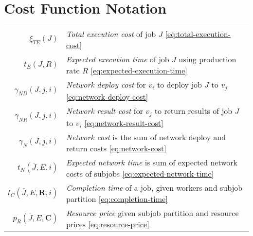 \documentclass[../mthe-493-project-proposal.tex]{subfiles}
\begin{document}
    \section*{Cost Function Notation}
    \begin{tabular}{rl}
    \(\xi_{TE}(J)\) & \textit{Total execution cost} of job \(J\) \eqref{eq:total-execution-cost} \\
    \(t_E(J, R)\) & \textit{Expected execution time} of job \(J\) using production rate \(R\) \eqref{eq:expected-execution-time} \\
    \(\gamma_{ND}(J, j, i)\) & \textit{Network deploy cost} for \(v_i\) to deploy job \(J\) to \(v_j\) \eqref{eq:network-deploy-cost} \\
    \(\gamma_{NR}(J, j, i)\) & \textit{Network result cost} for \(v_j\) to return results of job \(J\) to \(v_i\) \eqref{eq:network-result-cost} \\
    \(\gamma_N(J, j, i)\) & \textit{Network cost} is the sum of network deploy and return costs \eqref{eq:network-cost} \\
    \(t_N(\overline{J}, E, i)\) & \textit{Expected network time} is sum of expected network costs of subjobs \eqref{eq:expected-network-time} \\
    \(t_C(\overline{J}, E, \mathbf{R}, i)\) & \textit{Completion time} of a job, given workers and subjob partition \eqref{eq:completion-time} \\
    \(p_R(\overline{J}, E, \mathbf{C})\) & \textit{Resource price} given subjob partition and resource prices \eqref{eq:resource-price} \\
    \end{tabular}
    
\end{document}
